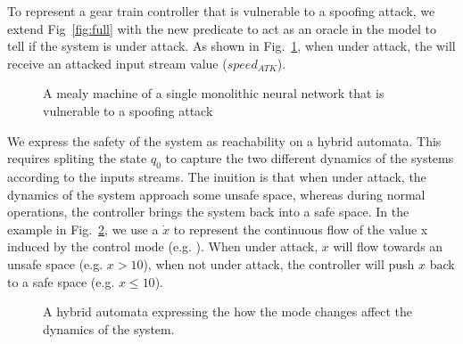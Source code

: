 To represent a gear train controller that is vulnerable to a spoofing attack, we extend Fig~\ref{fig:full} with the new predicate \isUnderAttack to act as an oracle in the model to tell if the system is under attack.
As shown in Fig.~\ref{fig:fullAtk}, when under attack, the \fullNN will receive an attacked input stream value ($speed_{ATK}$).

\begin{figure}[h!]
\centering
{}
\caption{A mealy machine of a single monolithic neural network that is vulnerable to a spoofing attack}
\label{fig:fullAtk}
\end{figure}

We express the safety of the system as reachability on a hybrid automata.
This requires spliting the state $q_0$ to capture the two different dynamics of the systems according to the inputs streams.
The inuition is that when under attack, the dynamics of the system approach some unsafe space, whereas during normal operations, the controller brings the system back into a safe space.
In the example in Fig.~\ref{fig:hybridGear}, we use a $\dot{x}$ to represent the continuous flow of the value x induced by the control mode (e.g. \fullNN).
When under attack, $x$ will flow towards an unsafe space (e.g. $x > 10$), when not under attack, the controller will push $x$ back to a safe space (e.g. $x\leq 10$).


\begin{figure}[h!]
\centering
{}
\caption{A hybrid automata expressing the how the mode changes affect the dynamics of the system.}
\label{fig:hybridGear}
\end{figure}



